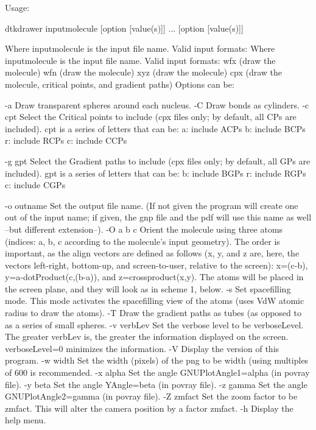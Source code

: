 Usage:

	dtkdrawer inputmolecule [option [value(s)]] ... [option [value(s)]]

Where inputmolecule is the input file name. Valid input formats:
Where inputmolecule is the input file name. Valid input formats:
            	wfx (draw the molecule)
            	wfn (draw the molecule)
            	xyz (draw the molecule)
            	cpx (draw the molecule, critical points, and
            	      gradient paths)
Options can be:

  -a        	Draw transparent spheres around each nucleus.
  -C        	Draw bonds as cylinders.
  -c  cpt   	Select the Critical points to include (cpx files only;
            	  by default, all CPs are included). cpt is a series
            	  of letters that can be:
            		a: include ACPs
            		b: include BCPs
            		r: include RCPs
            		c: include CCPs

  -g  gpt   	Select the Gradient paths to include (cpx files only;
            	  by default, all GPs are included).
            	  gpt is a series of letters
            	  that can be:
            		b: include BGPs
            		r: include RGPs
            		c: include CGPs

  -o outname	Set the output file name.
            	  (If not given the program will create one out of
            	  the input name; if given, the gnp file and the pdf will
            	  use this name as well --but different extension--).
  -O a b c  	Orient the molecule using three atoms (indices: a, b, c
            	 according to the molecule's input geometry). The order is
            	  important, as the align vectors are defined as follows
            	  (x, y, and z are, here, the vectors left-right,
            	  bottom-up, and screen-to-user, relative to the screen):
            	  x=(c-b), y=a-dotProduct(c,(b-a)), and z=crossproduct(x,y).
            	  The atoms will be placed in the screen plane, and they will
            	  look as in scheme 1, below.
  -s        	Set spacefilling mode. This mode activates the spacefilling
            	  view of the atoms (uses VdW atomic radius to draw the atoms).
  -T        	Draw the gradient paths as tubes (as opposed to as a series
            	  of small spheres.
  -v verbLev	Set the verbose level to be verboseLevel. The greater
            	  verbLev is, the greater the information displayed on the
            	  screen. verboseLevel=0 minimizes the information.
  -V        	Display the version of this program.
  -w width  	Set the width (pixels) of the png to be width (using multiples of
            	  600 is recommended.
  -x alpha  	Set the angle GNUPlotAngle1=alpha (in povray file).
  -y beta   	Set the angle YAngle=beta (in povray file).
  -z gamma  	Set the angle GNUPlotAngle2=gamma (in povray file).
  -Z zmfact 	Set the zoom factor to be zmfact. This will alter the camera
            	  position by a factor zmfact.
  -h     	Display the help menu.

